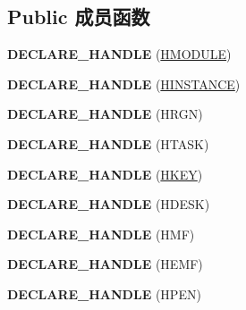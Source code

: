 \subsection*{Public 成员函数}
\begin{DoxyCompactItemize}
\item 
\mbox{\label{interface_i_win_types_ade0113b59f84f7e30d4607f4ddea4106}} 
{\bfseries D\+E\+C\+L\+A\+R\+E\+\_\+\+H\+A\+N\+D\+LE} (\hyperlink{interfacevoid}{H\+M\+O\+D\+U\+LE})
\item 
\mbox{\label{interface_i_win_types_a0470428f7a8eeec11f20a56a83e46977}} 
{\bfseries D\+E\+C\+L\+A\+R\+E\+\_\+\+H\+A\+N\+D\+LE} (\hyperlink{interfacevoid}{H\+I\+N\+S\+T\+A\+N\+CE})
\item 
\mbox{\label{interface_i_win_types_a346ad5d4226ed4433eb4a06e82d87655}} 
{\bfseries D\+E\+C\+L\+A\+R\+E\+\_\+\+H\+A\+N\+D\+LE} (H\+R\+GN)
\item 
\mbox{\label{interface_i_win_types_a9e18dda03771710c71f9fe3751e51a94}} 
{\bfseries D\+E\+C\+L\+A\+R\+E\+\_\+\+H\+A\+N\+D\+LE} (H\+T\+A\+SK)
\item 
\mbox{\label{interface_i_win_types_a861b5fbd27a6f5019cecfbcbe5f086c7}} 
{\bfseries D\+E\+C\+L\+A\+R\+E\+\_\+\+H\+A\+N\+D\+LE} (\hyperlink{interfacevoid}{H\+K\+EY})
\item 
\mbox{\label{interface_i_win_types_a2bdbfde273912aedcb87c7f00ad545cf}} 
{\bfseries D\+E\+C\+L\+A\+R\+E\+\_\+\+H\+A\+N\+D\+LE} (H\+D\+E\+SK)
\item 
\mbox{\label{interface_i_win_types_a1c909a8f1ccccda3bafa8c9770f9971d}} 
{\bfseries D\+E\+C\+L\+A\+R\+E\+\_\+\+H\+A\+N\+D\+LE} (H\+MF)
\item 
\mbox{\label{interface_i_win_types_a5bae62529da7858d7bf9f6011e03c326}} 
{\bfseries D\+E\+C\+L\+A\+R\+E\+\_\+\+H\+A\+N\+D\+LE} (H\+E\+MF)
\item 
\mbox{\label{interface_i_win_types_ac1df4a0a4099aa7189f1a9b7fb9b3e0e}} 
{\bfseries D\+E\+C\+L\+A\+R\+E\+\_\+\+H\+A\+N\+D\+LE} (H\+P\+EN)

\end{DoxyCompactItemize}
